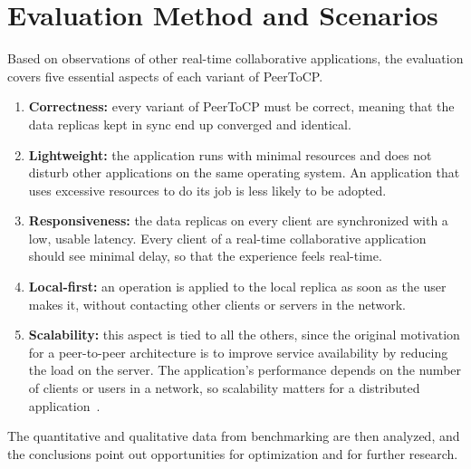 \section{Evaluation Method and Scenarios}
\label{sec:evaluasi}

Based on observations of other real-time collaborative applications, the evaluation covers five essential aspects of each variant of PeerToCP.

\begin{enumerate}
    \item \textbf{Correctness:} every variant of PeerToCP must be correct, meaning that the data replicas kept in sync end up converged and identical.
    \item \textbf{Lightweight:} the application runs with minimal resources and does not disturb other applications on the same operating system. An application that uses excessive resources to do its job is less likely to be adopted.
    \item \textbf{Responsiveness:} the data replicas on every client are synchronized with a low, usable latency. Every client of a real-time collaborative application should see minimal delay, so that the experience feels real-time.
    \item \textbf{Local-first:} an operation is applied to the local replica as soon as the user makes it, without contacting other clients or servers in the network.
    \item \textbf{Scalability:} this aspect is tied to all the others, since the original motivation for a peer-to-peer architecture is to improve service availability by reducing the load on the server. The application's performance depends on the number of clients or users in a network, so scalability matters for a distributed application~\citep{leibnitz2007peer}.
\end{enumerate}

The quantitative and qualitative data from benchmarking are then analyzed, and the conclusions point out opportunities for optimization and for further research.
